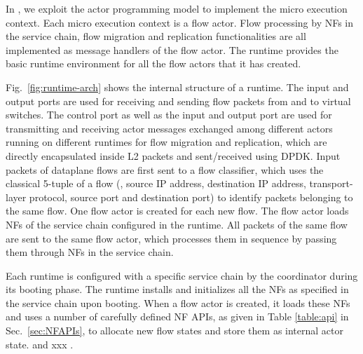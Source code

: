 In \nfactor, we exploit the actor programming model to implement the micro execution context. Each micro execution context is a flow actor. Flow processing by NFs in the service chain, flow migration and replication functionalities are all implemented as message handlers of the flow actor. The runtime provides the basic runtime environment for all the flow actors that it has created.


Fig.~\ref{fig:runtime-arch} shows the internal structure of a runtime. The input and output ports are used for receiving and sending flow packets from and to virtual switches. \ac{The control port as well as the input and output port are used for transmitting and receiving actor messages exchanged among different actors running on different runtimes for flow migration and replication, which are directly encapsulated inside L2 packets and sent/received using DPDK.} %
Input packets of dataplane flows are first sent to a flow classifier, which uses the classical 5-tuple of a flow (\ie, source IP address, destination IP address, transport-layer protocol, source port and destination port) to identify packets belonging to the same flow. One flow actor is created for each new flow. The flow actor loads NFs of the service chain configured in the runtime. All packets of the same flow are sent to the same flow actor, which processes them in sequence by passing them through NFs in the service chain.

Each runtime is configured with a specific service chain by the coordinator during its booting phase. The runtime installs and initializes all the NFs as specified in the service chain upon booting. When a flow actor is created, it loads these NFs and uses a number of carefully defined NF APIs, as given in Table \ref{table:api} in Sec.~\ref{sec:NFAPIs}, to allocate new flow states and store them as internal actor state. %
and xxx .


